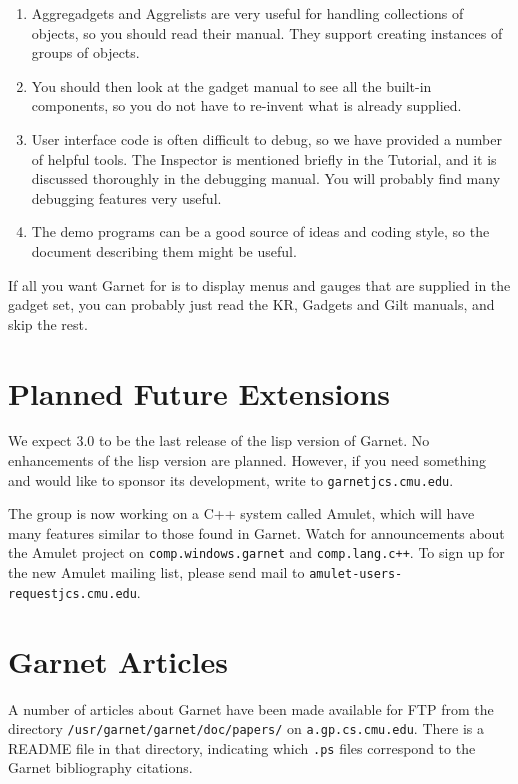 \documentclass{report}
\begin{document}
\begin{enumerate}
\item Aggregadgets and Aggrelists are very useful for handling
  collections of objects, so you should read their manual.  They
  support creating instances of groups of objects.
  
\item You should then look at the gadget manual to see all the
  built-in components, so you do not have to re-invent what is already
  supplied.
  
\item User interface code is often difficult to debug, so we have
  provided a number of helpful tools.  The Inspector is mentioned
  briefly in the Tutorial, and it is discussed thoroughly in the
  debugging manual.  You will probably find many debugging features
  very useful.
  
\item The demo programs can be a good source of ideas and coding
  style, so the document describing them might be useful.
\end{enumerate}

If all you want Garnet for is to display menus and gauges that are
supplied in the gadget set, you can probably just read the KR, Gadgets
and Gilt manuals, and skip the rest.


\section{Planned Future Extensions}
\label{future}

We expect 3.0 to be the last release of the lisp version of Garnet.
No enhancements of the lisp version are planned.  However, if you need
something and would like to sponsor its development, write to
\texttt{garnetjcs.cmu.edu}.

 The group is now working on a C++ system called Amulet,
which will have many features similar to those found in Garnet.  Watch
for announcements about the Amulet project on \texttt{comp.windows.garnet}
and \texttt{comp.lang.c++}.  To sign up for the new Amulet mailing list,
please send mail to \texttt{amulet-users-requestjcs.cmu.edu}.


\newpage
\section{Garnet Articles}
\label{articles}
 

A number of articles about Garnet have been made available for FTP
from the directory \texttt{/usr/garnet/garnet/doc/papers/} on
\texttt{a.gp.cs.cmu.edu}.  There is a README file in that directory,
indicating which \texttt{.ps} files correspond to the Garnet bibliography
citations.


\end{document}
